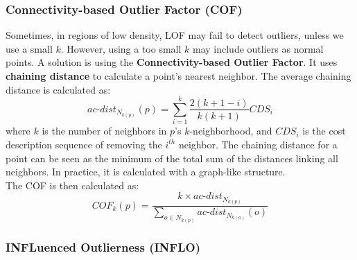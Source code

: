\subsubsection{Connectivity-based Outlier Factor (COF)}

Sometimes, in regions of low density, LOF may fail to detect outliers, unless we use a small $k$. However, using a too small $k$ may include outliers as normal points. A solution is using the \textbf{Connectivity-based Outlier Factor}. It uses \textbf{chaining distance} to calculate a point's nearest neighbor. The average chaining distance is calculated as:
\begin{equation*}
    \textit{ac-dist}_{N_{k(p)}}(p) = \sum_{i=1}^{k} \dfrac{2(k+1-i)}{k(k+1)} CDS_i
\end{equation*}
where $k$ is the number of neighbors in $p$'s $k$-neighborhood, and $CDS_i$ is the cost description sequence of removing the $i^{th}$ neighbor. The chaining distance for a point can be seen as the minimum of the total sum of the distances linking all neighbors. In practice, it is calculated with a graph-like structure. \\
The COF is then calculated as:
\begin{equation*}
    \textit{COF}_k(p) = \dfrac{k \times \textit{ac-dist}_{N_{k(p)}}}{\sum_{o \in N_{k(p)}} \textit{ac-dist}_{N_{k(o)}}(o)}
\end{equation*}

\subsubsection{INFLuenced Outlierness (INFLO)}

